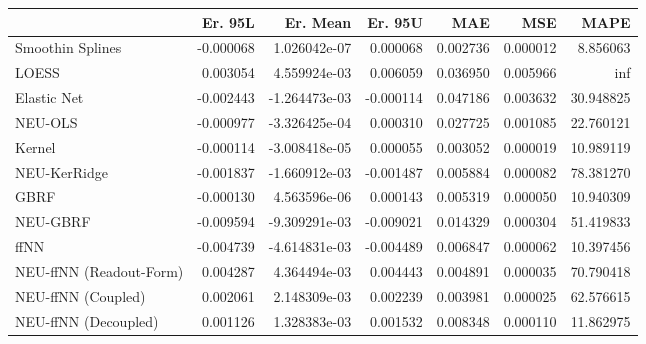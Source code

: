 \begin{tabular}{lrrrrrr}
\toprule
{} &   Er. 95L &      Er. Mean &   Er. 95U &       MAE &       MSE &       MAPE \\
\midrule
Smoothin Splines        & -0.000068 &  1.026042e-07 &  0.000068 &  0.002736 &  0.000012 &   8.856063 \\
LOESS                   &  0.003054 &  4.559924e-03 &  0.006059 &  0.036950 &  0.005966 &        inf \\
Elastic Net             & -0.002443 & -1.264473e-03 & -0.000114 &  0.047186 &  0.003632 &  30.948825 \\
NEU-OLS                 & -0.000977 & -3.326425e-04 &  0.000310 &  0.027725 &  0.001085 &  22.760121 \\
Kernel                  & -0.000114 & -3.008418e-05 &  0.000055 &  0.003052 &  0.000019 &  10.989119 \\
NEU-KerRidge            & -0.001837 & -1.660912e-03 & -0.001487 &  0.005884 &  0.000082 &  78.381270 \\
GBRF                    & -0.000130 &  4.563596e-06 &  0.000143 &  0.005319 &  0.000050 &  10.940309 \\
NEU-GBRF                & -0.009594 & -9.309291e-03 & -0.009021 &  0.014329 &  0.000304 &  51.419833 \\
ffNN                    & -0.004739 & -4.614831e-03 & -0.004489 &  0.006847 &  0.000062 &  10.397456 \\
NEU-ffNN (Readout-Form) &  0.004287 &  4.364494e-03 &  0.004443 &  0.004891 &  0.000035 &  70.790418 \\
NEU-ffNN (Coupled)      &  0.002061 &  2.148309e-03 &  0.002239 &  0.003981 &  0.000025 &  62.576615 \\
NEU-ffNN (Decoupled)    &  0.001126 &  1.328383e-03 &  0.001532 &  0.008348 &  0.000110 &  11.862975 \\
\bottomrule
\end{tabular}
